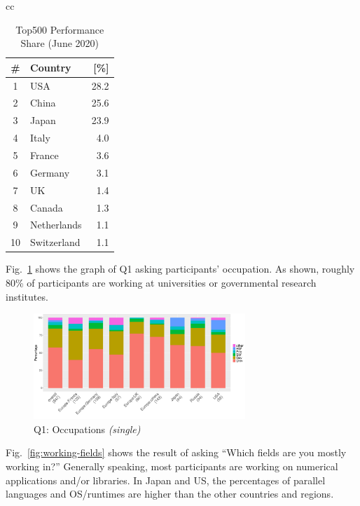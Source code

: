 \documentclass[conference,10pt,letterpaper]{IEEEtran}
\begin{document}
\begin{table}[htb]
\begin{center}
\begin{tabular}[t]{cc}
\begin{minipage}[t]{0.5\hsize}
        \begin{center}%
          \caption{Top500 Performance Share (June 2020)}%
          \label{tab:top500-share}%
          \begin{tabular}{c|l|r}%
            \hline%
            \# & Country & [\%] \\%
            \hline%
            1  & USA 	  & 28.2 \\%
            2  & China 	  & 25.6 \\%
            3  & Japan 	  & 23.9 \\%
            4  & Italy	  & 4.0  \\%
            5  & France	  & 3.6  \\%
            6  & Germany 	  & 3.1  \\%
            7  & UK		  & 1.4  \\%
            8  & Canada	  & 1.3  \\%
            9  & Netherlands  & 1.1  \\%
            10 & Switzerland  & 1.1  \\%
            \hline%
          \end{tabular}%
        \end{center}%
      \end{minipage}%
    \end{tabular}%
  \end{center}%
\end{table}%
%
%
Fig.~\ref{fig:occupations} shows the graph of Q1 asking participants'
occupation. As shown, roughly 80\% of participants are working at 
universities or governmental research institutes.
%
\begin{figure}[htb]
  \begin{center}
    \includegraphics[width=8cm]{R-scripts/Q1.pdf}
    \caption{Q1: Occupations {\it(single)}}
    \label{fig:occupations}
  \end{center}
\end{figure}

Fig.~\ref{fig:working-fields} shows the result of asking ``Which
fields are you mostly working in?'' Generally speaking, most
participants are working on numerical applications and/or
libraries. In Japan and US, the percentages of parallel languages and
OS/runtimes are higher than the other countries and regions.
\end{document}
